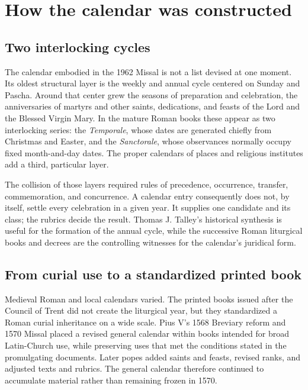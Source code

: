 \section{How the calendar was constructed}

\subsection{Two interlocking cycles}

The calendar embodied in the 1962 Missal is not a list devised at one moment. Its oldest structural layer is the weekly and annual cycle centered on Sunday and Pascha. Around that center grew the seasons of preparation and celebration, the anniversaries of martyrs and other saints, dedications, and feasts of the Lord and the Blessed Virgin Mary. In the mature Roman books these appear as two interlocking series: the \emph{Temporale}, whose dates are generated chiefly from Christmas and Easter, and the \emph{Sanctorale}, whose observances normally occupy fixed month-and-day dates. The proper calendars of places and religious institutes add a third, particular layer.

The collision of those layers required rules of precedence, occurrence, transfer, commemoration, and concurrence. A calendar entry consequently does not, by itself, settle every celebration in a given year. It supplies one candidate and its class; the rubrics decide the result. Thomas J. Talley's historical synthesis is useful for the formation of the annual cycle, while the successive Roman liturgical books and decrees are the controlling witnesses for the calendar's juridical form.

\subsection{From curial use to a standardized printed book}

Medieval Roman and local calendars varied. The printed books issued after the Council of Trent did not create the liturgical year, but they standardized a Roman curial inheritance on a wide scale. Pius V's 1568 Breviary reform and 1570 Missal placed a revised general calendar within books intended for broad Latin-Church use, while preserving uses that met the conditions stated in the promulgating documents. Later popes added saints and feasts, revised ranks, and adjusted texts and rubrics. The general calendar therefore continued to accumulate material rather than remaining frozen in 1570.

